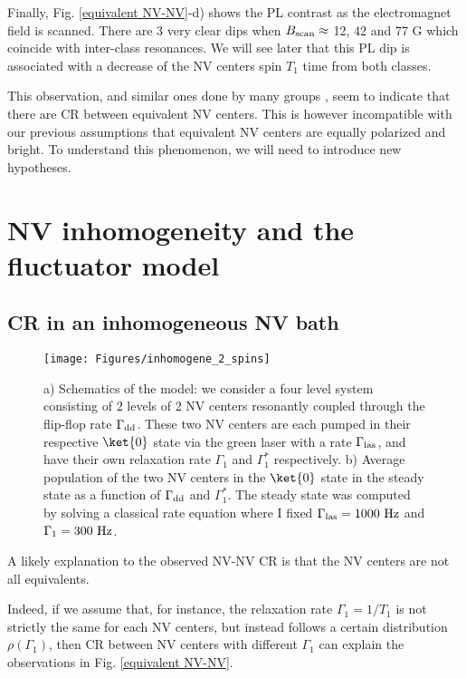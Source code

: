 \documentclass[a4paper,11pt]{report}
\begin{document}
Finally, Fig. \ref{equivalent NV-NV}-d) shows the PL contrast as the electromagnet field is scanned. There are 3 very clear dips when $B_{\rm scan} \approx$ 12, 42 and 77 G which coincide with inter-class resonances. We will see later that this PL dip is associated with a decrease of the NV centers spin $T_1$ time from both classes.

This observation, and similar ones done by many groups \citep{jarmola2012temperature, mrozek2015longitudinal, choi2017depolarization, akhmedzhanov2017microwave, giri2018coupled}, seem to indicate that there are CR between equivalent NV centers. This is however incompatible with our previous assumptions that equivalent NV centers are equally polarized and bright. To understand this phenomenon, we will need to introduce new hypotheses.

\section{NV inhomogeneity and the fluctuator model}

\subsection{CR in an inhomogeneous NV bath}
\begin{figure}[h]
\centering
\texttt{[image: Figures/inhomogene\_2\_spins]}
\caption{a) Schematics of the model: we consider a four level system consisting of 2 levels of 2 NV centers resonantly coupled through the flip-flop rate $\Gamma_{\rm dd}$. These two NV centers are each pumped in their respective $\ket{0}$ state via the green laser with a rate $\Gamma_{\rm las}$, and have their own relaxation rate $\Gamma_1$ and $\Gamma_1^*$ respectively. b) Average population of the two NV centers in the $\ket{0}$ state in the steady state as a function of $\Gamma_{\rm dd}$ and $\Gamma_1^*$. The steady state was computed by solving a classical rate equation where I fixed $\Gamma_{\rm las}=1000\ \rm Hz$ and $\Gamma_1=300\ \rm Hz$.}
\label{inhomogene}
\end{figure}
A likely explanation to the observed NV-NV CR is that the NV centers are not all equivalents.

Indeed, if we assume that, for instance, the relaxation rate $\Gamma_1=1/T_1$ is not strictly the same for each NV centers, but instead follows a certain distribution $\rho(\Gamma_1)$, then CR between NV centers with different $\Gamma_1$ can explain the observations in Fig. \ref{equivalent NV-NV}.
\end{document}
